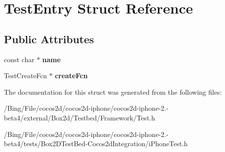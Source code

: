 \hypertarget{struct_test_entry}{\section{Test\-Entry Struct Reference}
\label{struct_test_entry}
}
\subsection*{Public Attributes}
\begin{DoxyCompactItemize}
\item 
\hypertarget{struct_test_entry_a266989f88c04af120b416effb73c94b4}{const char $\ast$ {\bfseries name}}\label{struct_test_entry_a266989f88c04af120b416effb73c94b4}

\item 
\hypertarget{struct_test_entry_a581b97ccba2225f7d629df46ab3a15ef}{Test\-Create\-Fcn $\ast$ {\bfseries create\-Fcn}}\label{struct_test_entry_a581b97ccba2225f7d629df46ab3a15ef}

\end{DoxyCompactItemize}


The documentation for this struct was generated from the following files\-:\begin{DoxyCompactItemize}
\item 
/\-Bing/\-File/cocos2d/cocos2d-\/iphone/cocos2d-\/iphone-\/2.-\/beta4/external/\-Box2d/\-Testbed/\-Framework/Test.\-h\item 
/\-Bing/\-File/cocos2d/cocos2d-\/iphone/cocos2d-\/iphone-\/2.-\/beta4/tests/\-Box2\-D\-Test\-Bed-\/\-Cocos2d\-Integration/i\-Phone\-Test.\-h\end{DoxyCompactItemize}
